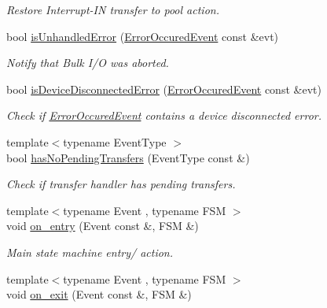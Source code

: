 \begin{DoxyCompactItemize}
\begin{DoxyCompactList}\small\item\em Restore Interrupt-\/\-I\-N transfer to pool action. \end{DoxyCompactList}\item 
bool \hyperlink{structmdt_usbtmc_transfer_handler_state_machine_1_1_state_machine___a0d57c25ef67c43a49b3e46a6adc3e970}{is\-Unhandled\-Error} (\hyperlink{structmdt_usbtmc_transfer_handler_state_machine_1_1_error_occured_event}{Error\-Occured\-Event} const \&evt)
\begin{DoxyCompactList}\small\item\em Notify that Bulk I/\-O was aborted. \end{DoxyCompactList}\item 
bool \hyperlink{structmdt_usbtmc_transfer_handler_state_machine_1_1_state_machine___a7f8e4be969af4b3e31aeecb7b13f5c11}{is\-Device\-Disconnected\-Error} (\hyperlink{structmdt_usbtmc_transfer_handler_state_machine_1_1_error_occured_event}{Error\-Occured\-Event} const \&evt)
\begin{DoxyCompactList}\small\item\em Check if \hyperlink{structmdt_usbtmc_transfer_handler_state_machine_1_1_error_occured_event}{Error\-Occured\-Event} contains a device disconnected error. \end{DoxyCompactList}\item 
{\footnotesize template$<$typename Event\-Type $>$ }\\bool \hyperlink{structmdt_usbtmc_transfer_handler_state_machine_1_1_state_machine___aba467800279f52d72567a129bc7f7de9}{has\-No\-Pending\-Transfers} (Event\-Type const \&)
\begin{DoxyCompactList}\small\item\em Check if transfer handler has pending transfers. \end{DoxyCompactList}\item 
{\footnotesize template$<$typename Event , typename F\-S\-M $>$ }\\void \hyperlink{structmdt_usbtmc_transfer_handler_state_machine_1_1_state_machine___a04baaf52ea2b575d575854b01dd7e67f}{on\-\_\-entry} (Event const \&, F\-S\-M \&)
\begin{DoxyCompactList}\small\item\em Main state machine entry/ action. \end{DoxyCompactList}\item 
{\footnotesize template$<$typename Event , typename F\-S\-M $>$ }\\void \hyperlink{structmdt_usbtmc_transfer_handler_state_machine_1_1_state_machine___a8e030f8b988709e105539c8f122eaa40}{on\-\_\-exit} (Event const \&, F\-S\-M \&)

\end{DoxyCompactItemize}
